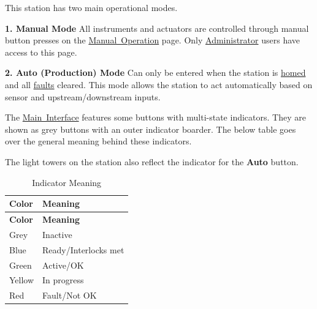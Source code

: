     

This station has two main operational modes.

{\bfseries{1. Manual Mode}} All instruments and actuators are controlled through manual button presses on the \mbox{\hyperlink{gui_gui_manual}{Manual Operation}} page. Only \mbox{\hyperlink{gui_gui_main_user}{Administrator}} users have access to this page.

{\bfseries{2. Auto (Production) Mode}} Can only be entered when the station is \mbox{\hyperlink{gui_gui_main_home}{homed}} and all \mbox{\hyperlink{faults}{faults}} cleared. This mode allows the station to act automatically based on sensor and upstream/downstream inputs.

The \mbox{\hyperlink{gui_gui_main}{Main Interface}} features some buttons with multi-\/state indicators. They are shown as grey buttons with an outer indicator boarder. The below table goes over the general meaning behind these indicators.

The light towers on the station also reflect the indicator for the {\bfseries{Auto}} button.

\hypertarget{modes_modes_ind_tbl}{}
\tabulinesep=1mm
\begin{longtabu}spread 0pt [c]{*{2}{|X[-1]}|}
\caption{Indicator Meaning}\label{modes_modes_ind_tbl}\\
\hline
\cellcolor{\tableheadbgcolor}\textbf{ Color}&\cellcolor{\tableheadbgcolor}\textbf{ Meaning }\\
\endfirsthead
\hline
\endfoot
\hline
\cellcolor{\tableheadbgcolor}\textbf{ Color}&\cellcolor{\tableheadbgcolor}\textbf{ Meaning }\\
\endhead
Grey&Inactive \\
Blue&Ready/\+Interlocks met \\
Green&Active/\+OK \\
Yellow&In progress \\
Red&Fault/\+Not OK \\
\end{longtabu}
